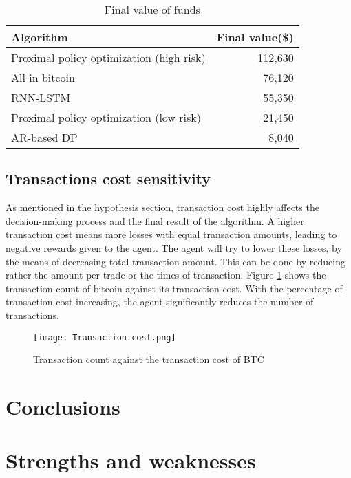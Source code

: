 \documentclass{mcmthesis}
\begin{document}
\begin{table}[H]
  \centering
  \begin{tabular}{@{}lr@{}}
    \toprule
    Algorithm & Final value(\$) \\
    \midrule
    Proximal policy optimization (high risk) & 112,630 \\
    {\color{gray} All in bitcoin} & {\color{gray} 76,120} \\
    RNN-LSTM & 55,350 \\
    Proximal policy optimization (low risk) & 21,450 \\
    AR-based DP & 8,040 \\
    \bottomrule
  \end{tabular}
  \caption{Final value of funds}
  \label{final-value}
\end{table}

\subsection{Transactions cost sensitivity}

As mentioned in the hypothesis section, transaction cost highly affects the decision-making process and the final result of the algorithm.
A higher transaction cost means more losses with equal transaction amounts,
leading to negative rewards given to the agent.
The agent will try to lower these losses, by the means of decreasing total transaction amount.
This can be done by reducing rather the amount per trade or the times of transaction.
Figure \ref{Transaction-cost} shows the transaction count of bitcoin against its transaction cost.
With the percentage of transaction cost increasing, the agent significantly reduces the number of transactions.

\begin{figure}[h]
  \small
  \centering
  \texttt{[image: Transaction-cost.png]}
  \caption{Transaction count against the transaction cost of BTC}
  \label{Transaction-cost}
\end{figure}

\section{Conclusions}
\lipsum[6]

\section{Strengths and weaknesses}
\lipsum[12]
\end{document}
